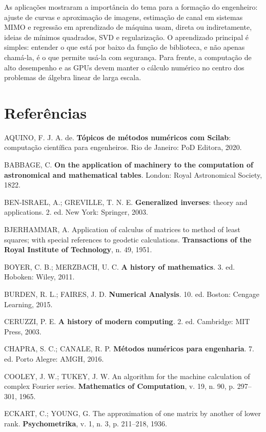 \documentclass[12pt,a4paper,oneside]{report}
\begin{document}
As aplicações mostraram a importância do tema para a formação do engenheiro: ajuste de curvas e aproximação de imagens, estimação de canal em sistemas MIMO e regressão em aprendizado de máquina usam, direta ou indiretamente, ideias de mínimos quadrados, SVD e regularização. O aprendizado principal é simples: entender o que está por baixo da função de biblioteca, e não apenas chamá-la, é o que permite usá-la com segurança. Para frente, a computação de alto desempenho e as GPUs devem manter o cálculo numérico no centro dos problemas de álgebra linear de larga escala.

\chapter*{Referências}
\begingroup
\singlespacing
\setlength{\parindent}{0pt}
\setlength{\parskip}{0.9em}

AQUINO, F. J. A. de. \textbf{Tópicos de métodos numéricos com Scilab}: computação científica
para engenheiros. Rio de Janeiro: PoD Editora, 2020.

BABBAGE, C. \textbf{On the application of machinery to the computation of astronomical and
mathematical tables}. London: Royal Astronomical Society, 1822.

BEN-ISRAEL, A.; GREVILLE, T. N. E. \textbf{Generalized inverses}: theory and applications.
2. ed. New York: Springer, 2003.

BJERHAMMAR, A. Application of calculus of matrices to method of least squares; with special
references to geodetic calculations. \textbf{Transactions of the Royal Institute of Technology},
n. 49, 1951.

BOYER, C. B.; MERZBACH, U. C. \textbf{A history of mathematics}. 3. ed. Hoboken: Wiley, 2011.

BURDEN, R. L.; FAIRES, J. D. \textbf{Numerical Analysis}. 10. ed. Boston: Cengage Learning, 2015.

CERUZZI, P. E. \textbf{A history of modern computing}. 2. ed. Cambridge: MIT Press, 2003.

CHAPRA, S. C.; CANALE, R. P. \textbf{Métodos numéricos para engenharia}. 7. ed. Porto Alegre:
AMGH, 2016.

COOLEY, J. W.; TUKEY, J. W. An algorithm for the machine calculation of complex Fourier series.
\textbf{Mathematics of Computation}, v. 19, n. 90, p. 297--301, 1965.

ECKART, C.; YOUNG, G. The approximation of one matrix by another of lower rank.
\textbf{Psychometrika}, v. 1, n. 3, p. 211--218, 1936.
\end{document}
